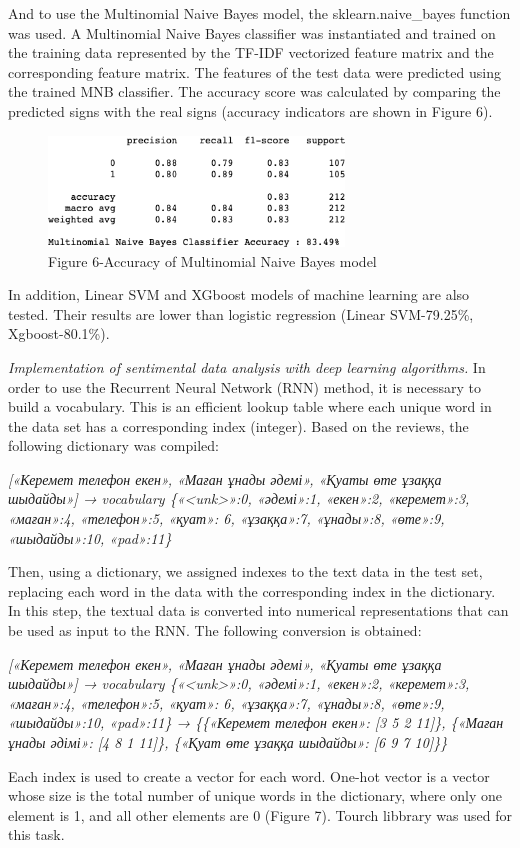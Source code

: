 \begin{multicols}{2}
And to use the Multinomial Naive Bayes model, the sklearn.naive\_bayes
function was used. A Multinomial Naive Bayes classifier was instantiated
and trained on the training data represented by the TF-IDF vectorized
feature matrix and the corresponding feature matrix. The features of the
test data were predicted using the trained MNB classifier. The accuracy
score was calculated by comparing the predicted signs with the real
signs (accuracy indicators are shown in Figure 6).
\end{multicols}

\begin{figure}[H]
	\centering
	\includegraphics[width=0.7\textwidth]{media/ict/image13}
	\caption*{Figure 6-Accuracy of Multinomial Naive Bayes model}
\end{figure}

\begin{multicols}{2}
In addition, Linear SVM and XGboost models of machine learning are also
tested. Their results are lower than logistic regression (Linear
SVM-79.25\%, Xgboost-80.1\%).

\emph{Implementation of sentimental data analysis with deep learning
algorithms.} In order to use the Recurrent Neural Network (RNN) method,
it is necessary to build a vocabulary. This is an efficient lookup table
where each unique word in the data set has a corresponding index
(integer). Based on the reviews, the following dictionary was compiled:

\emph{{[}«Керемет телефон екен», «Маған ұнады әдемі», «Қуаты өте ұзаққа
шыдайды»{]} → vocabulary \{«\textless unk\textgreater»:0, «әдемі»:1,
«екен»:2, «керемет»:3, «маған»:4, «телефон»:5, «қуат»: 6, «ұзаққа»:7,
«ұнады»:8, «өте»:9, «шыдайды»:10, «pad»:11\}}

Then, using a dictionary, we assigned indexes to the text data in the
test set, replacing each word in the data with the corresponding index
in the dictionary. In this step, the textual data is converted into
numerical representations that can be used as input to the RNN. The
following conversion is obtained:

\emph{{[}«Керемет телефон екен», «Маған ұнады әдемі», «Қуаты өте ұзаққа
шыдайды»{]} → vocabulary \{«\textless unk\textgreater»:0, «әдемі»:1,
«екен»:2, «керемет»:3, «маған»:4, «телефон»:5, «қуат»: 6, «ұзаққа»:7,
«ұнады»:8, «өте»:9, «шыдайды»:10, «pad»:11\} → \{\{«Керемет телефон
екен»: {[}3 5 2 11{]}\}, \{«Маған ұнады әдімі»: {[}4 8 1 11{]}\},
\{«Қуат өте ұзаққа шыдайды»: {[}6 9 7 10{]}\}\}}

Each index is used to create a vector for each word. One-hot vector is a
vector whose size is the total number of unique words in the dictionary,
where only one element is 1, and all other elements are 0 (Figure 7).
Tourch libbrary was used for this task.
\end{multicols}

